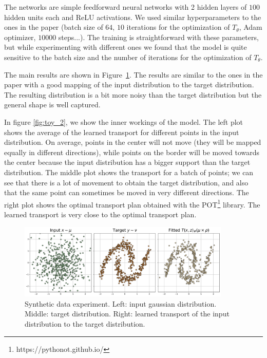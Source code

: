 \documentclass[11pt]{article}
\begin{document}
The networks are simple feedforward neural networks with 2 hidden layers of $100$ hidden units each and ReLU activations. We used similar hyperparameters to the ones in the paper (batch size of $64$, $10$ iterations for the optimization of $T_\theta$, Adam optimizer, $10000$ steps...). The training is straightforward with these parameters, but while experimenting with different ones we found that the model is quite sensitive to the batch size and the number of iterations for the optimization of $T_\theta$.

The main results are shown in Figure~\ref{fig:toy_1}. The results are similar to the ones in the paper with a good mapping of the input distribution to the target distribution. The resulting distribution is a bit more noisy than the target distribution but the general shape is well captured.

In figure \ref{fig:toy_2}, we show the inner workings of the model. The left plot shows the average of the learned transport for different points in the input distribution. On average, points in the center will not move (they will be mapped equally in different directions), while points on the border will be moved towards the center because the input distribution has a bigger support than the target distribution. The middle plot shows the transport for a batch of points; we can see that there is a lot of movement to obtain the target distribution, and also that the same point can sometimes be moved in very different directions. The right plot shows the optimal transport plan obtained with the POT\footnote{https://pythonot.github.io/} library. The learned transport is very close to the optimal transport plan.

\begin{figure}[H]
    \centering
    \includegraphics[width=0.9\textwidth]{figures/toy_1.png}
    \caption{Synthetic data experiment. Left: input gaussian distribution. Middle: target distribution. Right: learned transport of the input distribution to the target distribution.}
    \label{fig:toy_1}
    \bigskip
\end{figure}
\end{document}
